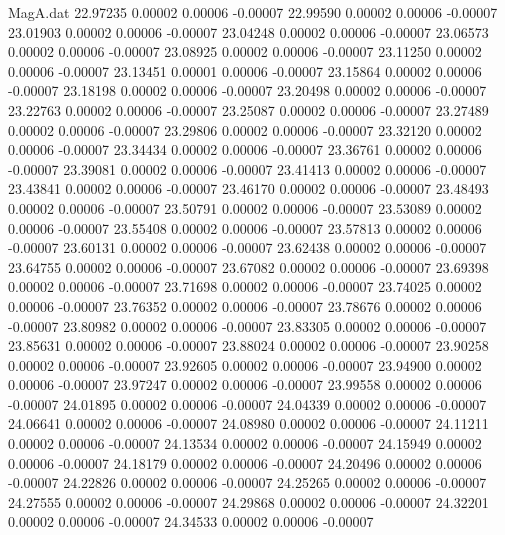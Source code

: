 \begin{filecontents}{MagA.dat}
  22.97235    0.00002    0.00006   -0.00007
  22.99590    0.00002    0.00006   -0.00007
  23.01903    0.00002    0.00006   -0.00007
  23.04248    0.00002    0.00006   -0.00007
  23.06573    0.00002    0.00006   -0.00007
  23.08925    0.00002    0.00006   -0.00007
  23.11250    0.00002    0.00006   -0.00007
  23.13451    0.00001    0.00006   -0.00007
  23.15864    0.00002    0.00006   -0.00007
  23.18198    0.00002    0.00006   -0.00007
  23.20498    0.00002    0.00006   -0.00007
  23.22763    0.00002    0.00006   -0.00007
  23.25087    0.00002    0.00006   -0.00007
  23.27489    0.00002    0.00006   -0.00007
  23.29806    0.00002    0.00006   -0.00007
  23.32120    0.00002    0.00006   -0.00007
  23.34434    0.00002    0.00006   -0.00007
  23.36761    0.00002    0.00006   -0.00007
  23.39081    0.00002    0.00006   -0.00007
  23.41413    0.00002    0.00006   -0.00007
  23.43841    0.00002    0.00006   -0.00007
  23.46170    0.00002    0.00006   -0.00007
  23.48493    0.00002    0.00006   -0.00007
  23.50791    0.00002    0.00006   -0.00007
  23.53089    0.00002    0.00006   -0.00007
  23.55408    0.00002    0.00006   -0.00007
  23.57813    0.00002    0.00006   -0.00007
  23.60131    0.00002    0.00006   -0.00007
  23.62438    0.00002    0.00006   -0.00007
  23.64755    0.00002    0.00006   -0.00007
  23.67082    0.00002    0.00006   -0.00007
  23.69398    0.00002    0.00006   -0.00007
  23.71698    0.00002    0.00006   -0.00007
  23.74025    0.00002    0.00006   -0.00007
  23.76352    0.00002    0.00006   -0.00007
  23.78676    0.00002    0.00006   -0.00007
  23.80982    0.00002    0.00006   -0.00007
  23.83305    0.00002    0.00006   -0.00007
  23.85631    0.00002    0.00006   -0.00007
  23.88024    0.00002    0.00006   -0.00007
  23.90258    0.00002    0.00006   -0.00007
  23.92605    0.00002    0.00006   -0.00007
  23.94900    0.00002    0.00006   -0.00007
  23.97247    0.00002    0.00006   -0.00007
  23.99558    0.00002    0.00006   -0.00007
  24.01895    0.00002    0.00006   -0.00007
  24.04339    0.00002    0.00006   -0.00007
  24.06641    0.00002    0.00006   -0.00007
  24.08980    0.00002    0.00006   -0.00007
  24.11211    0.00002    0.00006   -0.00007
  24.13534    0.00002    0.00006   -0.00007
  24.15949    0.00002    0.00006   -0.00007
  24.18179    0.00002    0.00006   -0.00007
  24.20496    0.00002    0.00006   -0.00007
  24.22826    0.00002    0.00006   -0.00007
  24.25265    0.00002    0.00006   -0.00007
  24.27555    0.00002    0.00006   -0.00007
  24.29868    0.00002    0.00006   -0.00007
  24.32201    0.00002    0.00006   -0.00007
  24.34533    0.00002    0.00006   -0.00007

\end{filecontents}
